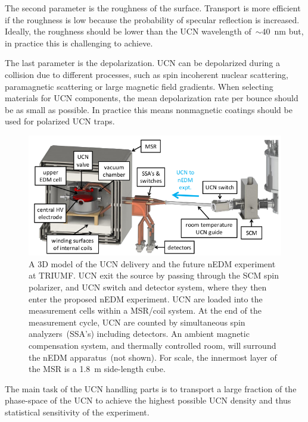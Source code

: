The second parameter is the roughness of the surface. Transport
is more efficient if the roughness is low because the probability of
specular reflection is increased. Ideally, the roughness should be
lower than the UCN wavelength of~$\sim 40$~nm but, in practice this is
challenging to achieve.

The last parameter is the depolarization. UCN can be depolarized
during a collision due to different processes, such as spin incoherent
nuclear scattering, paramagnetic scattering or large magnetic field
gradients.  When selecting materials for UCN components, the mean
depolarization rate per bounce should be as small as possible. In
practice this means nonmagnetic coatings should be used for polarized
UCN traps.
\begin{figure}[h!]
  \centering
  \includegraphics[width=1.0\textwidth]{UCNdelivery.png}
  \caption[3D model of TUCAN's future UCN delivery for the nEDM
  measurement]{A 3D model of the UCN delivery and the future nEDM
    experiment at TRIUMF. UCN exit the source by passing through the
    SCM spin polarizer, and UCN switch and detector system, where they
    then enter the proposed nEDM experiment. UCN are loaded into the
    measurement cells within a MSR/coil system. At the end of the
    measurement cycle, UCN are counted by simultaneous spin
    analyzers~(SSA’s) including detectors. An ambient magnetic
    compensation system, and thermally controlled room, will surround
    the nEDM apparatus~(not shown). For scale, the innermost layer of
    the MSR is a 1.8~m side-length cube.}
  \label{fig:UCNdelivery}
\end{figure}



The main task of the UCN handling parts is to transport a large
fraction of the phase-space of the UCN to achieve the highest possible
UCN density and thus statistical sensitivity of the experiment.

